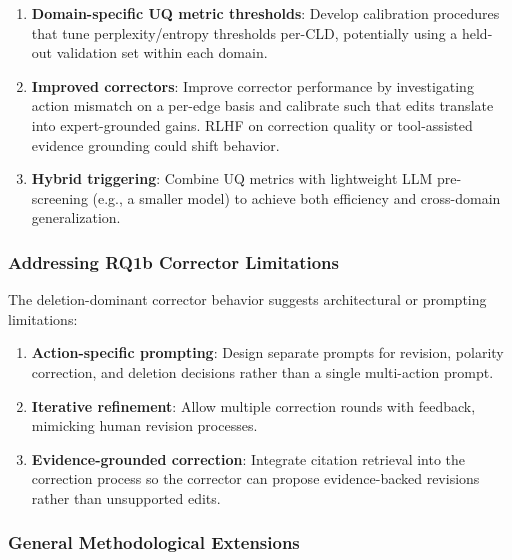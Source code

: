 \begin{enumerate}[noitemsep]
    \item \textbf{Domain-specific UQ metric thresholds}: Develop calibration procedures that tune perplexity/entropy thresholds per-CLD, potentially using a held-out validation set within each domain.
    \item \textbf{Improved correctors}: Improve corrector performance by investigating action mismatch on a per-edge basis and calibrate such that edits translate into expert-grounded gains. RLHF on correction quality or tool-assisted evidence grounding could shift behavior.
    \item \textbf{Hybrid triggering}: Combine UQ metrics with lightweight LLM pre-screening (e.g., a smaller model) to achieve both efficiency and cross-domain generalization.
\end{enumerate}

\subsubsection{Addressing RQ1b Corrector Limitations}

The deletion-dominant corrector behavior suggests architectural or prompting limitations:

\begin{enumerate}[noitemsep]
    \item \textbf{Action-specific prompting}: Design separate prompts for revision, polarity correction, and deletion decisions rather than a single multi-action prompt.
    \item \textbf{Iterative refinement}: Allow multiple correction rounds with feedback, mimicking human revision processes.
    \item \textbf{Evidence-grounded correction}: Integrate citation retrieval into the correction process so the corrector can propose evidence-backed revisions rather than unsupported edits.
\end{enumerate}

\subsubsection{General Methodological Extensions}


